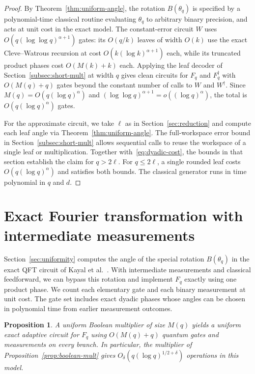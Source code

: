 \documentclass[11pt]{article}
\newtheorem{proposition}[theorem]{Proposition}
\begin{document}
\begin{proof}
By Theorem~\ref{thm:uniform-angle}, the rotation $B(\theta_q)$ is specified by a polynomial-time classical routine evaluating $\theta_q$ to arbitrary binary precision, and acts at unit cost in the exact model. The constant-error circuit $W$ uses $O(q(\log\log q)^{\alpha+1})$ gates: its $O(q/k)$ leaves of width $O(k)$ use the exact Cleve--Watrous recursion at cost $O(k(\log k)^{\alpha+1})$ each, while its truncated product phases cost $O(M(k) + k)$ each. Applying the leaf decoder of Section~\ref{subsec:short-mult} at width $q$ gives clean circuits for $F_q$ and $F_q^\dagger$ with $O(M(q)+q)$ gates beyond the constant number of calls to $W$ and $W^\dagger$. Since $M(q)=O(q(\log q)^\alpha)$ and $(\log\log q)^{\alpha+1}=o((\log q)^\alpha)$, the total is $O(q(\log q)^\alpha)$ gates.

For the approximate circuit, we take $\ell$ as in Section~\ref{sec:reduction} and compute each leaf angle via Theorem~\ref{thm:uniform-angle}. The full-workspace error bound in Section~\ref{subsec:short-mult} allows sequential calls to reuse the workspace of a single leaf or multiplication. Together with~\eqref{eq:dyadic-cost}, the bounds in that section establish the claim for $q>2\ell$. For $q\le 2\ell$, a single rounded leaf costs $O(q(\log q)^\alpha)$ and satisfies both bounds. The classical generator runs in time polynomial in $q$ and $d$.
\end{proof}

\section{Exact Fourier transformation with intermediate measurements}\label{sec:adaptive}

Section~\ref{sec:uniformity} computes the angle of the special rotation $B(\theta_q)$ in the exact QFT circuit of Kayal et al.~\cite{kmps2026}. With intermediate measurements and classical feedforward, we can bypass this rotation and implement $F_q$ exactly using one product phase. We count each elementary gate and each binary measurement at unit cost. The gate set includes exact dyadic phases whose angles can be chosen in polynomial time from earlier measurement outcomes.

\begin{proposition}\label{prop:adaptive}
A uniform Boolean multiplier of size $M(q)$ yields a uniform exact adaptive circuit for $F_q$ using $O(M(q)+q)$ quantum gates and measurements on every branch. In particular, the multiplier of Proposition~\ref{prop:boolean-mult} gives $O_\delta(q(\log q)^{1/2+\delta})$ operations in this model.
\end{proposition}
\end{document}
